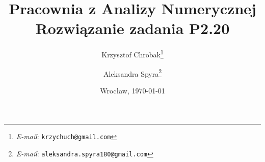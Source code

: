 \documentclass[12pt,a4paper,wide,authortitle]{mwart}
\numberwithin{figure}{section}
\numberwithin{table}{section}
\begin{document}
\title{\LARGE \textbf{Pracownia z Analizy Numerycznej}\\Rozwiązanie zadania P2.20}
\author{Krzysztof Chrobak\thanks{\textit{E-mail}:
\texttt{krzychuch@gmail.com}} \and Aleksandra Spyra\thanks{\textit{E-mail}:
\texttt{aleksandra.spyra180@gmail.com}}}
\date {Wrocław, \today}
\maketitle
\tableofcontents
\newpage








\end{document}

